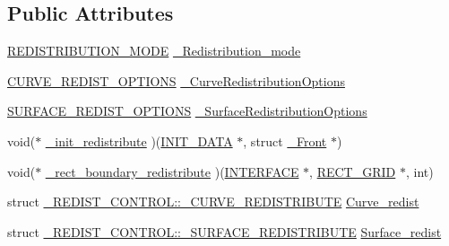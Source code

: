\subsection*{Public Attributes}
\begin{DoxyCompactItemize}
\item 
\hyperlink{fdecs_8h_a01f67da2a9919f737c24b70c7932c0f1}{R\+E\+D\+I\+S\+T\+R\+I\+B\+U\+T\+I\+O\+N\+\_\+\+M\+O\+DE} \hyperlink{struct___r_e_d_i_s_t___c_o_n_t_r_o_l_aa15fc9dcac54d12e8315ee1e1d53086c}{\+\_\+\+Redistribution\+\_\+mode}
\item 
\hyperlink{fdecs_8h_ad4d3270f83bf00f0840e705ca687b246}{C\+U\+R\+V\+E\+\_\+\+R\+E\+D\+I\+S\+T\+\_\+\+O\+P\+T\+I\+O\+NS} \hyperlink{struct___r_e_d_i_s_t___c_o_n_t_r_o_l_a0bd5ab72b6a7bd85356d72c90d11dc60}{\+\_\+\+Curve\+Redistribution\+Options}
\item 
\hyperlink{fdecs_8h_a918b379cff0db156afc89d0ccbb67838}{S\+U\+R\+F\+A\+C\+E\+\_\+\+R\+E\+D\+I\+S\+T\+\_\+\+O\+P\+T\+I\+O\+NS} \hyperlink{struct___r_e_d_i_s_t___c_o_n_t_r_o_l_a654869214097f2bceb597e193c28d5c6}{\+\_\+\+Surface\+Redistribution\+Options}
\item 
void($\ast$ \hyperlink{struct___r_e_d_i_s_t___c_o_n_t_r_o_l_a91de76898983d74ac663dd3f89341b2f}{\+\_\+init\+\_\+redistribute} )(\hyperlink{cdecs_8h_a18423d263765f9b6e78d8f1089446c91}{I\+N\+I\+T\+\_\+\+D\+A\+TA} $\ast$, struct \hyperlink{struct___front}{\+\_\+\+Front} $\ast$)
\item 
void($\ast$ \hyperlink{struct___r_e_d_i_s_t___c_o_n_t_r_o_l_aaa362609205391fa17085f2864999fb6}{\+\_\+rect\+\_\+boundary\+\_\+redistribute} )(\hyperlink{int_8h_a58cf562d0d320a608294b7310ea167dc}{I\+N\+T\+E\+R\+F\+A\+CE} $\ast$, \hyperlink{geom_8h_a983fdb6b46c9b99969bffa62eae7d31d}{R\+E\+C\+T\+\_\+\+G\+R\+ID} $\ast$, int)
\item 
struct \hyperlink{struct___r_e_d_i_s_t___c_o_n_t_r_o_l_d9/d1b/struct___r_e_d_i_s_t___c_o_n_t_r_o_l_1_1___c_u_r_v_e___r_e_d_i_s_t_r_i_b_u_t_e}{\+\_\+\+R\+E\+D\+I\+S\+T\+\_\+\+C\+O\+N\+T\+R\+O\+L\+::\+\_\+\+C\+U\+R\+V\+E\+\_\+\+R\+E\+D\+I\+S\+T\+R\+I\+B\+U\+TE} \hyperlink{struct___r_e_d_i_s_t___c_o_n_t_r_o_l_acc88786e6164f28c1fbc7bc2ceaeb38f}{Curve\+\_\+redist}
\item 
struct \hyperlink{struct___r_e_d_i_s_t___c_o_n_t_r_o_l_1_1___s_u_r_f_a_c_e___r_e_d_i_s_t_r_i_b_u_t_e}{\+\_\+\+R\+E\+D\+I\+S\+T\+\_\+\+C\+O\+N\+T\+R\+O\+L\+::\+\_\+\+S\+U\+R\+F\+A\+C\+E\+\_\+\+R\+E\+D\+I\+S\+T\+R\+I\+B\+U\+TE} \hyperlink{struct___r_e_d_i_s_t___c_o_n_t_r_o_l_a29cd71a801bd2c91527ad5799c344962}{Surface\+\_\+redist}
\item 

\end{DoxyCompactItemize}
